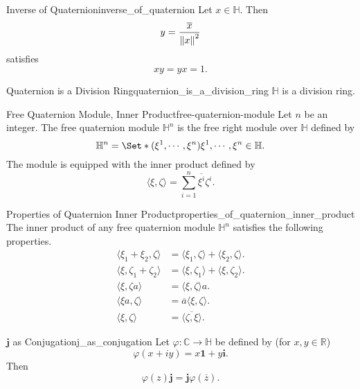 \documentclass{article}
\begin{document}
\begin{theorem}{Inverse of Quaternion}{inverse_of_quaternion}
    Let $x\in\mathbb{H}$. Then
    \[ y = \frac{\overline{x}}{\norm{x}^2} \]
    satisfies
    \[ x y = y x = 1. \]
\end{theorem}

\begin{theorem}{Quaternion is a Division Ring}{quaternion_is_a_division_ring}
    $\mathbb{H}$ is a division ring.
\end{theorem}

\begin{definition}{Free Quaternion Module, Inner Product}{free-quaternion-module}
    Let $n$ be an integer.
    The free quaternion module $\mathbb{H}^n$ is the free right module over $\mathbb{H}$ defined by
    \[ \mathbb{H}^n = \Set*{(\xi^1,\cdots,\xi^n)}{\xi^1,\cdots,\xi^n\in\mathbb{H}}. \]
    The module is equipped with the inner product defined by
    \[ \langle \xi,\zeta \rangle = \sum_{i=1}^n \overline{\xi^i}\zeta^i. \]
\end{definition}

\begin{proposition}{Properties of Quaternion Inner Product}{properties_of_quaternion_inner_product}
    The inner product of any free quaternion module $\mathbb{H}^n$ satisfies the following properties.
    \begin{align*}
        \langle \xi_1 + \xi_2, \zeta \rangle &= \langle \xi_1,\zeta \rangle + \langle \xi_2,\zeta \rangle. \\
        \langle \xi, \zeta_1+\zeta_2 \rangle &= \langle \xi,\zeta_1 \rangle + \langle \xi,\zeta_2 \rangle. \\
        \langle \xi, \zeta a \rangle &= \langle \xi,\zeta \rangle a. \\
        \langle \xi a, \zeta \rangle &= \overline{a} \langle \xi,\zeta \rangle. \\
        \langle \xi, \zeta \rangle &= \overline{\langle \zeta,\xi \rangle}.
    \end{align*}
\end{proposition}

\begin{proposition}{$\mathbf{j}$ as Conjugation}{j_as_conjugation}
    Let $\varphi: \mathbb{C} \rightarrow \mathbb{H}$ be defined by (for $x,y\in\mathbb{R}$)
    \[ \varphi(x+iy) = x\mathbf{1} + y\mathbf{i}. \]
    Then
    \[ \varphi(z)\mathbf{j} = \mathbf{j}\varphi(\overline{z}). \]
\end{proposition}
\end{document}
